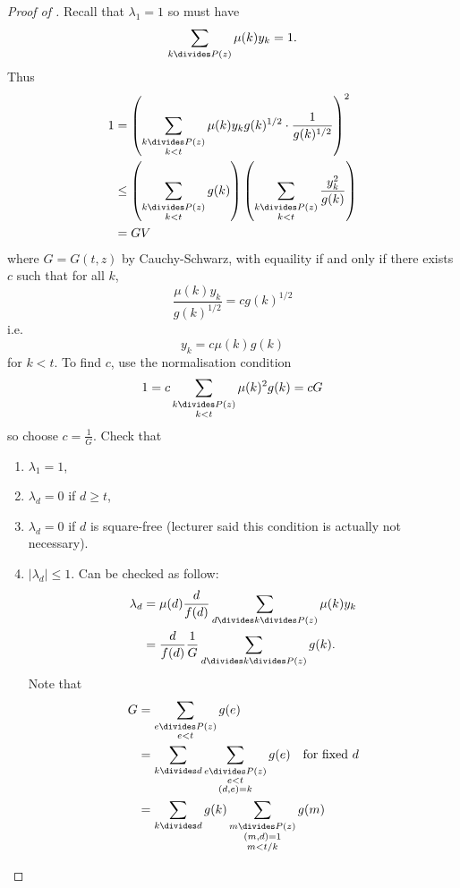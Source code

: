 \documentclass[a4paper]{article}
\begin{document}
\begin{proof}[Proof of ]
  Recall that \(\lambda_1 = 1\) so must have
  \[
    \sum_{k \divides P(z)} \mu(k) y_k = 1.
  \]
  Thus
  \begin{align*}
    1
    &= \left( \sum_{\substack{k \divides P(z) \\ k < t}} \mu(k) y_k g(k)^{1/2} \cdot \frac{1}{g(k)^{1/2}} \right)^2 \\
    &\leq \left( \sum_{\substack{k \divides P(z) \\ k < t}} g(k) \right) \left( \sum_{\substack{k \divides P(z) \\ k < t}} \frac{y_k^2}{g(k)} \right) \\
    &= GV
  \end{align*}
  where \(G = G(t, z)\) by Cauchy-Schwarz, with equaility if and only if there exists \(c\) such that for all \(k\),
  \[
    \frac{\mu(k) y_k}{g(k)^{1/2}} = c g(k)^{1/2}
  \]
  i.e.
  \[
    y_k = c \mu(k) g(k)
  \]
  for \(k < t\). To find \(c\), use the normalisation condition
  \[
    1 = c \sum_{\substack{k \divides P(z) \\ k < t}} \mu(k)^2 g(k) = cG
  \]
  so choose \(c = \frac{1}{G}\). Check that
  \begin{enumerate}
  \item \(\lambda_1 = 1\),
  \item \(\lambda_d = 0\) if \(d \geq t\),
  \item \(\lambda_d = 0\) if \(d\) is square-free (lecturer said this condition is actually not necessary).
  \item \(|\lambda_d| \leq 1\). Can be checked as follow:
    \begin{align*}
      \lambda_d
      &= \mu(d) \frac{d}{f(d)} \sum_{d \divides k \divides P(z)} \mu(k) y_k \\
      &= \frac{d}{f(d)} \frac{1}{G} \sum_{d \divides k \divides P(z)} g(k).
    \end{align*}
    Note that
    \begin{align*}
      G
      &= \sum_{\substack{e \divides P(z) \\ e < t}} g(e) \\
      &= \sum_{k \divides d} \sum_{\substack{e \divides P(z) \\ e < t \\ (d, e) = k}} g(e) \quad \text{for fixed \(d\)} \\
      &= \sum_{k \divides d} g(k) \sum_{\substack{m \divides P(z) \\ (m, d) = 1 \\ m < t/k}} g(m) \\

\end{align*}
\end{enumerate}
\end{proof}
\end{document}
